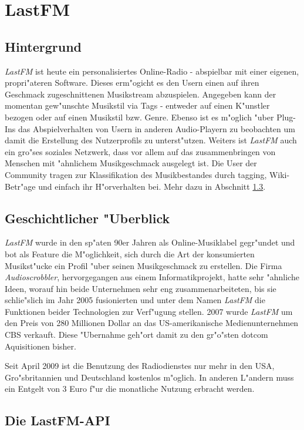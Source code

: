 \section{LastFM}
\subsection{Hintergrund}
\textit{LastFM} ist heute ein personalisiertes Online-Radio - abspielbar mit einer eigenen, propri"ateren Software. Dieses erm"ogicht es den Usern einen auf ihren Geschmack zugeschnittenen Musikstream abzuspielen. Angegeben kann der momentan gew"unschte Musikstil via Tags - entweder auf einen K"unstler bezogen oder auf einen Musikstil bzw. Genre. Ebenso ist es m"oglich "uber Plug-Ins das Abspielverhalten von Usern in anderen Audio-Playern zu beobachten um damit die Erstellung des Nutzerprofils zu unterst"utzen.
Weiters ist \textit{LastFM} auch ein gro"ses soziales Netzwerk, dass vor allem auf das zusammenbringen von Menschen mit "ahnlichem Musikgeschmack ausgelegt ist. Die User der Community tragen zur Klassifikation des Musikbestandes durch tagging, Wiki-Betr"age und einfach ihr H"orverhalten bei. Mehr dazu in Abschnitt \ref{features_lastfm}.

\subsection{Geschichtlicher "Uberblick}
\textit{LastFM} wurde in den sp"aten 90er Jahren als Online-Musiklabel gegr"undet und bot als Feature die M"oglichkeit, sich durch die Art der konsumierten Musikst"ucke ein Profil "uber seinen Musikgeschmack zu erstellen. Die Firma \textit{Audioscrobbler}, hervorgegangen aus einem Informatikprojekt, hatte sehr "ahnliche Ideen, worauf hin beide Unternehmen sehr eng zusammenarbeiteten, bis sie schlie"slich im Jahr 2005 fusionierten und unter dem Namen \textit{LastFM} die Funktionen beider Technologien zur Verf"ugung stellen.
2007 wurde \textit{LastFM} um den Preis von 280 Millionen Dollar an das US-amerikanische Medienunternehmen CBS verkauft. Diese "Ubernahme geh"ort damit zu den gr"o"sten dotcom Aquisitionen bisher. 

Seit April 2009 ist die Benutzung des Radiodienstes nur mehr in den USA, Gro"sbritannien und Deutschland kostenlos m"oglich. In anderen L"andern muss ein Entgelt von 3 Euro f"ur die monatliche Nutzung erbracht werden.

\subsection{Die LastFM-API}
\label{features_lastfm}
